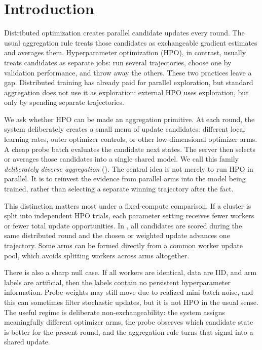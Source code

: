 \section{Introduction}
\label{sec:intro}

Distributed optimization creates parallel candidate updates every round. The
usual aggregation rule treats those candidates as exchangeable gradient
estimates and averages them. Hyperparameter optimization (HPO), in contrast,
usually treats candidates as separate jobs: run several trajectories, choose
one by validation performance, and throw away the others. These two practices
leave a gap. Distributed training has already paid for parallel exploration,
but standard aggregation does not use it as exploration; external HPO uses
exploration, but only by spending separate trajectories.

We ask whether HPO can be made an aggregation primitive. At each round, the
system deliberately creates a small menu of update candidates: different local
learning rates, outer optimizer controls, or other low-dimensional optimizer
arms. A cheap probe batch evaluates the candidate next states. The server then
selects or averages those candidates into a single shared model. We call this
family \emph{deliberately diverse aggregation} (\method). The central idea is
not merely to run HPO in parallel. It is to reinvest the evidence from parallel
arms into the model being trained, rather than selecting a separate winning
trajectory after the fact.

This distinction matters most under a fixed-compute comparison. If a cluster
is split into independent HPO trials, each parameter setting receives fewer
workers or fewer total update opportunities. In \method, all candidates are
scored during the same distributed round and the chosen or weighted update
advances one trajectory. Some arms can be formed directly from a common worker
update pool, which avoids splitting workers across arms altogether.

There is also a sharp null case. If all workers are identical, data are IID,
and arm labels are artificial, then the labels contain no persistent
hyperparameter information. Probe weights may still move due to realized
mini-batch noise, and this can sometimes filter stochastic updates, but it is
not HPO in the usual sense. The useful regime is deliberate
non-exchangeability: the system assigns meaningfully different optimizer arms,
the probe observes which candidate state is better for the present round, and
the aggregation rule turns that signal into a shared update.

